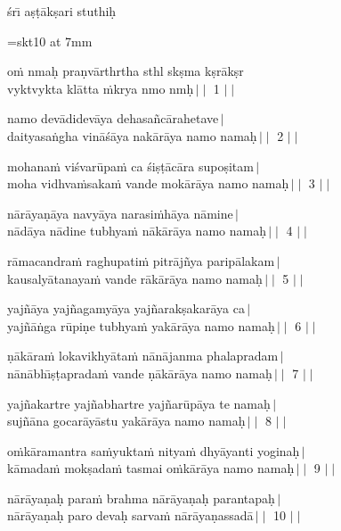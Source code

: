 \documentclass[12pt]{article}
\begin{document}
{\sktX \'sr\={\i} a\d s\d t\=ak\d sari stuthi\d h }

\font\bigskt=skt10 at 7mm

{\sktX \bigskt o\.m nma\d h pra\d nv\=arthrtha sthl sk\d sma k\d sr\=ak\d sr \\
vyktvykta kl\=atta \.mkrya nmo nm\d h{\upshape\boldmath\,$\mid\mid$} 1\,{\upshape\boldmath\,$\mid\mid$}}

{\sktX namo dev\=adidev\=aya dehasa\~nc\=arahetave{\upshape\boldmath\,$\mid$} \\
daityasa\.ngha vin\=a\'s\=aya nak\=ar\=aya namo nama\d h{\upshape\boldmath\,$\mid\mid$} 2\,{\upshape\boldmath\,$\mid\mid$}}

{\sktX mohana\.m vi\'svar\=upa\.m ca \'si\d s\d t\=ac\=ara supo\d sitam{\upshape\boldmath\,$\mid$} \\
moha vidhva\.msaka\.m vande mok\=ar\=aya namo nama\d h{\upshape\boldmath\,$\mid\mid$} 3\,{\upshape\boldmath\,$\mid\mid$} }

{\sktX n\=ar\=aya\d n\=aya navy\=aya narasi\.mh\=aya n\=amine{\upshape\boldmath\,$\mid$} \\
n\=ad\=aya n\=adine tubhya\.m n\=ak\=ar\=aya namo nama\d h{\upshape\boldmath\,$\mid\mid$} 4\,{\upshape\boldmath\,$\mid\mid$} }

{\sktX r\=amacandra\.m raghupati\.m pitr\=aj\~nya parip\=alakam{\upshape\boldmath\,$\mid$} \\
kausaly\=atanaya\.m vande r\=ak\=ar\=aya namo nama\d h{\upshape\boldmath\,$\mid\mid$} 5\,{\upshape\boldmath\,$\mid\mid$} }

{\sktX yaj\~n\=aya yaj\~nagamy\=aya yaj\~narak\d sakar\=aya ca{\upshape\boldmath\,$\mid$} \\
yaj\~n\=a\.nga r\=upi\d ne tubhya\.m yak\=ar\=aya namo nama\d h{\upshape\boldmath\,$\mid\mid$} 6\,{\upshape\boldmath\,$\mid\mid$} }

{\sktX \d n\=ak\=ara\.m lokavikhy\=ata\.m n\=an\=ajanma phalapradam{\upshape\boldmath\,$\mid$} \\
n\=an\=abh\={\i}\d s\d taprada\.m vande \d n\=ak\=ar\=aya namo nama\d h{\upshape\boldmath\,$\mid\mid$} 7\,{\upshape\boldmath\,$\mid\mid$} }

{\sktX yaj\~nakartre yaj\~nabhartre yaj\~nar\=up\=aya te nama\d h{\upshape\boldmath\,$\mid$} \\
suj\~n\=ana gocar\=ay\=astu yak\=ar\=aya namo nama\d h{\upshape\boldmath\,$\mid\mid$} 8\,{\upshape\boldmath\,$\mid\mid$} }

{\sktX o\.mk\=aramantra sa\.myukta\.m nitya\.m dhy\=ayanti yogina\d h{\upshape\boldmath\,$\mid$} \\
k\=amada\.m mok\d sada\.m tasmai o\.mk\=ar\=aya namo nama\d h{\upshape\boldmath\,$\mid\mid$} 9\,{\upshape\boldmath\,$\mid\mid$} }

{\sktX n\=ar\=aya\d na\d h para\.m brahma n\=ar\=aya\d na\d h parantapa\d h{\upshape\boldmath\,$\mid$} \\
n\=ar\=aya\d na\d h paro deva\d h sarva\.m n\=ar\=aya\d nassad\=a{\upshape\boldmath\,$\mid\mid$} 10\,{\upshape\boldmath\,$\mid\mid$} }
\end{document}
